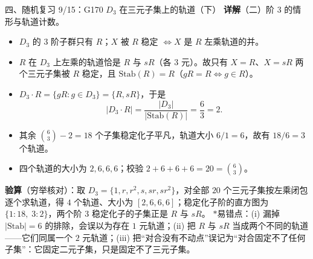 \documentclass[aspectratio=169,10pt,fontset=none]{ctexbeamer}
\newcommand{\key}[1]{\textcolor{ink}{\bfseries #1}}
\newcommand{\starpt}{\textcolor{accent}{\bfseries$\ast$}}
\begin{document}
\begin{frame}[t]{四、随机复习 9/15：G170 $D_3$ 在三元子集上的轨道（下）}
\scriptsize
\key{详解}（二）阶 $3$ 的情形与轨道计数。
\begin{itemize}\setlength{\itemsep}{1pt}\setlength{\parsep}{0pt}
\item $D_3$ 的 $3$ 阶子群只有 $R$；$X$ 被 $R$ 稳定 $\iff X$ 是 $R$ 左乘轨道的并。
\item $R$ 在 $D_3$ 上左乘的轨道恰是 $R$ 与 $sR$（各 $3$ 元）。故只有 $X=R$、$X=sR$ 两个三元子集被 $R$ 稳定，且 $\mathrm{Stab}(R)=R$（$gR=R\iff g\in R$）。
\item $D_3\cdot R=\{gR:g\in D_3\}=\{R,sR\}$，于是
\[ |D_3\cdot R|=\frac{|D_3|}{|\mathrm{Stab}(R)|}=\frac63=2 .\]
\item 其余 $\binom63-2=18$ 个子集稳定化子平凡，轨道大小 $6/1=6$，故有 $18/6=3$ 个轨道。
\item 四个轨道的大小为 $2,6,6,6$；校验 $2+6+6+6=20=\binom63$。
\end{itemize}
\key{验算}（穷举核对）：取 $D_3=\{1,r,r^2,s,sr,sr^2\}$，对全部 $20$ 个三元子集按左乘闭包逐个求轨道，得 $4$ 个轨道、大小为 $[2,6,6,6]$；稳定化子阶的直方图为 $\{1{:}18,\;3{:}2\}$，两个阶 $3$ 稳定化子的子集正是 $R$ 与 $sR$。
\starpt 易错点：(i) 漏掉 $|\mathrm{Stab}|=6$ 的排除，会误以为存在 $1$ 元轨道；(ii) 把 $R$ 与 $sR$ 当成两个不同的轨道——它们同属一个 $2$ 元轨道；(iii) 把“对合没有不动点”误记为“对合固定不了任何子集”：它固定二元子集，只是固定不了三元子集。
\end{frame}
\end{document}
